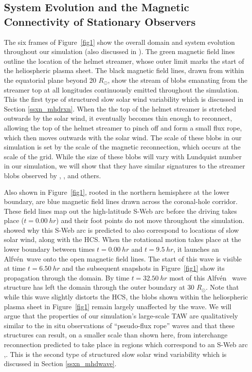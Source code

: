 \documentclass[preprint]{aastex62}
\newcommand{\Alfven}{Alfv\'{e}n\ }
\begin{document}
\subsection{System Evolution and the Magnetic Connectivity of Stationary Observers}
\label{ssxn_system}

The six frames of Figure~\ref{fig1} show the overall domain and
system evolution throughout our simulation (also discussed in
). The green magnetic field lines outline
the location of the helmet streamer, whose outer limit marks the
start of the heliospheric plasma sheet. The black magnetic field
lines, drawn from within the equatorial plane beyond 20 $R_\odot$,
show the stream of blobs emanating from the streamer top at all
longitudes continuously emitted throughout the simulation. This the first type of structured 
slow solar wind variability which is discussed in Section \ref{ssxn_mhdrxn}. When the
the top of the helmet streamer is stretched outwards by the solar
wind, it eventually becomes thin enough to reconnect, allowing the
top of the helmet streamer to pinch off and form a small flux rope,
which then moves outwards with the solar wind. The scale of these
blobs in our simulation is set by the scale of the magnetic
reconnection, which occurs at the scale of the grid. While the size
of these blobs will vary with Lundquist number in our simulation,
we will show that they have similar signatures to the streamer blobs
observed by \citet{Sheeley2009}, \citet{Rouillard2011}, and others.

Also shown in Figure~\ref{fig1}, rooted in the northern hemisphere
at the lower boundary, are blue magnetic field lines drawn across
the coronal-hole corridor. These field lines map out the high-latitude
S-Web arc before the driving takes place ($t = 0.00~hr$) and their
foot points do not move throughout the simulation.  showed why 
this S-Web arc is predicted to also correspond to locations of slow solar wind, along with the HCS. When the rotational
motion takes place at the lower boundary between times $t = 0.00~hr$
and $t = 9.5~hr$, it launches an \Alfven wave onto the open magnetic
field lines. The start of this wave is visible at time $t = 6.50~hr$
and the subsequent snapshots in Figure~\ref{fig1} show its propagation
through the domain. By time $t = 32.50~hr$ most of this \Alfven
wave structure has left the domain through the outer boundary at
30 $R_\odot$. Note that while this wave slightly distorts the HCS,
the blobs shown within the heliospheric plasma sheet in Figure~\ref{fig1}
remain largely unaffected by the wave. We will argue that the
properties of our simulation's large-scale TAW are qualitatively
similar to the in situ observations of ``pseudo-flux rope'' waves
and that these structures can result, on a smaller scale than shown here, from interchange reconnection predicted to take place in regions which correspond to an S-Web arc ,. This is the second type of structured slow
solar wind variability which is discussed in Section \ref{ssxn_mhdwave}.
\end{document}
